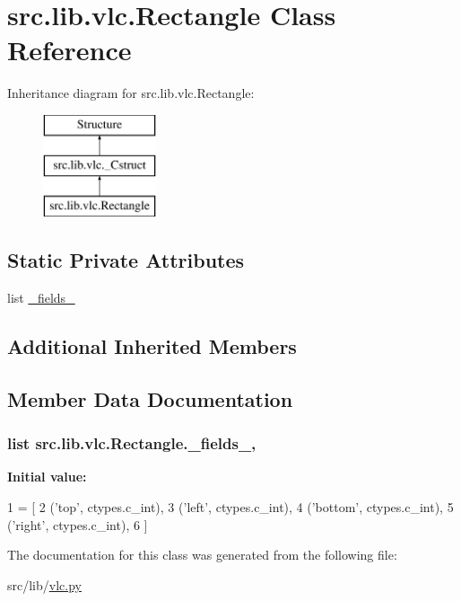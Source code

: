 \hypertarget{classsrc_1_1lib_1_1vlc_1_1Rectangle}{}\section{src.\+lib.\+vlc.\+Rectangle Class Reference}
\label{classsrc_1_1lib_1_1vlc_1_1Rectangle}
Inheritance diagram for src.\+lib.\+vlc.\+Rectangle\+:\begin{figure}[H]
\begin{center}
\leavevmode
\includegraphics[height=3.000000cm]{classsrc_1_1lib_1_1vlc_1_1Rectangle}
\end{center}
\end{figure}
\subsection*{Static Private Attributes}
\begin{DoxyCompactItemize}
\item 
list \hyperlink{classsrc_1_1lib_1_1vlc_1_1Rectangle_afaeec066d99b840e72a6bff71e02536c}{\+\_\+fields\+\_\+}
\end{DoxyCompactItemize}
\subsection*{Additional Inherited Members}


\subsection{Member Data Documentation}
\hypertarget{classsrc_1_1lib_1_1vlc_1_1Rectangle_afaeec066d99b840e72a6bff71e02536c}{}
\subsubsection[{\+\_\+fields\+\_\+}]{\setlength{\rightskip}{0pt plus 5cm}list src.\+lib.\+vlc.\+Rectangle.\+\_\+fields\+\_\+\hspace{0.3cm}{\ttfamily [static]}, {\ttfamily [private]}}\label{classsrc_1_1lib_1_1vlc_1_1Rectangle_afaeec066d99b840e72a6bff71e02536c}
{\bfseries Initial value\+:}
\begin{DoxyCode}
1 = [
2         (\textcolor{stringliteral}{'top'},    ctypes.c\_int),
3         (\textcolor{stringliteral}{'left'},   ctypes.c\_int),
4         (\textcolor{stringliteral}{'bottom'}, ctypes.c\_int),
5         (\textcolor{stringliteral}{'right'},  ctypes.c\_int),
6     ]
\end{DoxyCode}


The documentation for this class was generated from the following file\+:\begin{DoxyCompactItemize}
\item 
src/lib/\hyperlink{vlc_8py}{vlc.\+py}\end{DoxyCompactItemize}
